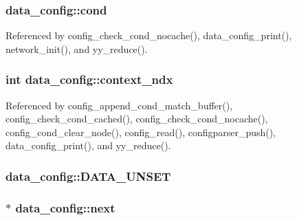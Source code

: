 \hypertarget{structdata__config_a32e710d73d1c5af42cd41b77162e0013}{
\subsubsection[{cond}]{ data\-\_\-config\-::cond}}\label{structdata__config_a32e710d73d1c5af42cd41b77162e0013}


Referenced by config\-\_\-check\-\_\-cond\-\_\-nocache(), data\-\_\-config\-\_\-print(), network\-\_\-init(), and yy\-\_\-reduce().

\hypertarget{structdata__config_a213f0e25f7057b689b947be0642fae90}{
\subsubsection[{context\-\_\-ndx}]{\setlength{\rightskip}{0pt plus 5cm}int data\-\_\-config\-::context\-\_\-ndx}}\label{structdata__config_a213f0e25f7057b689b947be0642fae90}


Referenced by config\-\_\-append\-\_\-cond\-\_\-match\-\_\-buffer(), config\-\_\-check\-\_\-cond\-\_\-cached(), config\-\_\-check\-\_\-cond\-\_\-nocache(), config\-\_\-cond\-\_\-clear\-\_\-node(), config\-\_\-read(), configparser\-\_\-push(), data\-\_\-config\-\_\-print(), and yy\-\_\-reduce().

\hypertarget{structdata__config_a2aee520a0f3d8c6bc21385ba8602205f}{
\subsubsection[{D\-A\-T\-A\-\_\-\-U\-N\-S\-E\-T}]{\setlength{\rightskip}{0pt plus 5cm}data\-\_\-config\-::\-D\-A\-T\-A\-\_\-\-U\-N\-S\-E\-T}}\label{structdata__config_a2aee520a0f3d8c6bc21385ba8602205f}
\hypertarget{structdata__config_af34a7ae7d4a627191cab13e2ff114df3}{
\subsubsection[{next}]{$\ast$ data\-\_\-config\-::next}}\label{structdata__config_af34a7ae7d4a627191cab13e2ff114df3}


